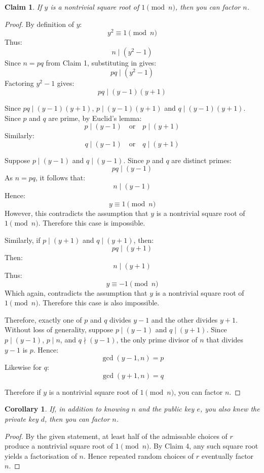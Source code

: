 \documentclass{article}
\newtheorem{claim}{Claim}
\newtheorem*{corollary}{Corollary}
\begin{document}
\begin{claim}
    If $y$ is a nontrivial square root of $1 \pmod{n}$, then you can factor $n$.
\end{claim}

\begin{proof}
    By definition of $y$:
    \[
    y^{2} \equiv 1 \pmod{n}
    \]
    Thus:
    \[
    n \mid (y^{2} - 1)
    \]
    Since $n = pq$ from Claim 1, substituting in gives:
    \[
    pq \mid (y^{2} - 1)
    \]
    Factoring $y^{2} - 1$ gives:
    \[
    pq \mid (y - 1)(y + 1)
    \]

    \medskip

    Since $pq \mid (y - 1)(y + 1)$, $p \mid (y - 1)(y + 1)$ and $q \mid (y - 1)(y + 1)$. Since $p$ and $q$ are prime, 
    by Euclid's lemma:
    \[
    p \mid (y - 1) \quad \text{or} \quad p \mid (y + 1)
    \]
    Similarly:
    \[
    q \mid (y - 1) \quad \text{or} \quad q \mid (y + 1)
    \]
    
    \medskip

    Suppose $p \mid (y - 1)$ and $q \mid (y - 1)$. Since $p$ and $q$ are distinct primes:
    \[
    pq \mid (y - 1)
    \]
    As $n = pq$, it follows that:
    \[
    n \mid (y - 1)
    \]
    Hence:
    \[
    y \equiv 1 \pmod{n}
    \]
    However, this contradicts the assumption that $y$ is a nontrivial square root of $1 \pmod{n}$. Therefore this 
    case is impossible.

    \medskip

    Similarly, if $p \mid (y + 1)$ and $q \mid (y + 1)$, then:
    \[
    pq \mid (y + 1)
    \]
    Then:
    \[
    n \mid (y + 1)
    \]
    Thus:
    \[
    y \equiv -1 \pmod{n}
    \]
    Which again, contradicts the assumption that $y$ is a nontrivial square root of $1 \pmod{n}$. Therefore this 
    case is also impossible.

    \medskip

    Therefore, exactly one of $p$ and $q$ divides $y - 1$ and the other divides $y + 1$. Without loss of generality, 
    suppose $p \mid (y - 1)$ and $q \mid (y + 1)$. Since $p \mid (y - 1)$, $p \mid n$, and $q \nmid (y - 1)$, 
    the only prime divisor of $n$ that divides $y - 1$ is $p$. Hence:
    \[
    \gcd(y - 1, n) = p
    \]
    Likewise for $q$:
    \[
    \gcd(y + 1, n) = q
    \]

    \medskip

    Therefore if $y$ is a nontrivial square root of $1 \pmod{n}$, you can factor $n$.
\end{proof}

\begin{corollary}
    If, in addition to knowing $n$ and the public key $e$, you also knew the private key $d$, then you can factor $n$.
\end{corollary}

\begin{proof}
    By the given statement, at least half of the admissable choices of $r$ produce a nontrivial square root of $1 
    \pmod{n}$. By Claim 4, any such square root yields a factorisation of $n$. Hence repeated random choices of $r$ 
    eventually factor $n$.
\end{proof}
\end{document}
